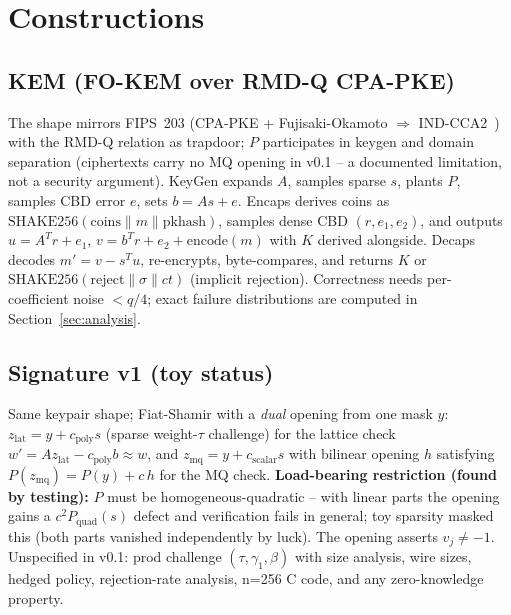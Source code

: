 \section{Constructions}
\label{sec:kem}

\subsection{KEM (FO-KEM over RMD-Q CPA-PKE)}
\label{sec:kemech}

The shape mirrors FIPS~203 (CPA-PKE + Fujisaki-Okamoto $\Rightarrow$
IND-CCA2~\cite{HHK17}) with the RMD-Q relation as trapdoor; $P$
participates in keygen and domain separation (ciphertexts carry no MQ
opening in v0.1 -- a documented limitation, not a security argument).
\textsf{KeyGen} expands $A$, samples sparse $s$, plants $P$, samples
CBD error $e$, sets $b=As+e$. \textsf{Encaps} derives coins as
$\mathrm{SHAKE256}(\text{coins}\|m\|\mathrm{pkhash})$, samples dense CBD
$(r,e_1,e_2)$, and outputs $u=A^Tr+e_1$,
$v=b^Tr+e_2+\mathrm{encode}(m)$ with $K$ derived alongside.
\textsf{Decaps} decodes $m'=v-s^Tu$, re-encrypts, byte-compares, and
returns $K$ or $\mathrm{SHAKE256}(\text{reject}\|\sigma\|ct)$ (implicit
rejection). Correctness needs per-coefficient noise $< q/4$; exact failure
distributions are computed in Section~\ref{sec:analysis}.

\subsection{Signature v1 (toy status)}
\label{sec:sig}

Same keypair shape; Fiat-Shamir with a \emph{dual} opening from one mask
$y$: $z_{\mathrm{lat}} = y + c_{\mathrm{poly}} s$ (sparse weight-$\tau$
challenge) for the lattice check $w' = Az_{\mathrm{lat}}-c_{\mathrm{poly}}b
\approx w$, and $z_{\mathrm{mq}} = y + c_{\mathrm{scalar}} s$ with bilinear
opening $h$ satisfying $P(z_{\mathrm{mq}}) = P(y) + c\,h$ for the MQ check.
\textbf{Load-bearing restriction (found by testing):} $P$ must be
homogeneous-quadratic -- with linear parts the opening gains a
$c^2P_{\mathrm{quad}}(s)$ defect and verification fails in general; toy
sparsity masked this (both parts vanished independently by luck). The
opening asserts $v_j\ne -1$. Unspecified in v0.1: prod challenge
$(\tau,\gamma_1,\beta)$ with size analysis, wire sizes, hedged policy,
rejection-rate analysis, n=256 C code, and any zero-knowledge property.

